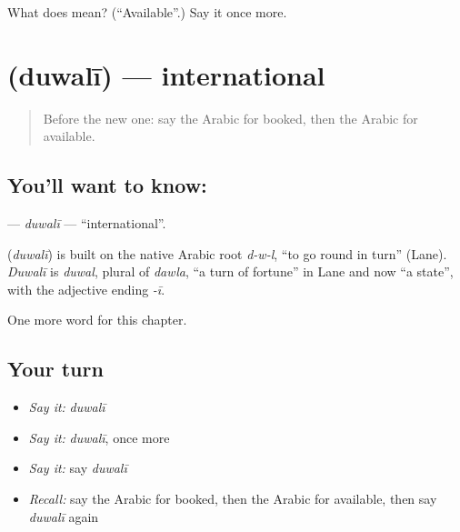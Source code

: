 \begin{tcolorbox}[breakable,colback=teal!4,colframe=teal!35!black,title={Before you move on}]
What does  mean? (\textquotedblleft{}Available\textquotedblright{}.) Say it once more.
\end{tcolorbox}
\section[\texorpdfstring{\ar{دولي} (duwalī)}{دولي (duwalī)}]{ (duwalī) — international}

\label{lesson:AR-C270-duwali}



\begin{quote}
Before the new one: say the Arabic for booked, then the Arabic for available.
\end{quote}

\subsection*{You'll want to know: }
\textbf{} — \emph{duwalī} — \textquotedblleft{}international\textquotedblright{}.

\begin{cousinweb}
\textbf{} (\emph{duwalī}) is built on the native Arabic root \emph{d-w-l}, \textquotedblleft{}to go round in turn\textquotedblright{} (Lane). \emph{Duwalī} is \emph{duwal}, plural of \emph{dawla}, \textquotedblleft{}a turn of fortune\textquotedblright{} in Lane and now \textquotedblleft{}a state\textquotedblright{}, with the adjective ending \emph{-ī}.
\end{cousinweb}

\begin{grammarlens}[title={What you've built}]
One more word for this chapter.
\end{grammarlens}

\subsection*{Your turn}
\begin{itemize}
\raggedright
  \item \emph{Say it:} \emph{duwalī}
  \item \emph{Say it:} \emph{duwalī}, once more
  \item \emph{Say it:} say \emph{duwalī}
  \item \emph{Recall:} say the Arabic for booked, then the Arabic for available, then say \emph{duwalī} again
\end{itemize}

